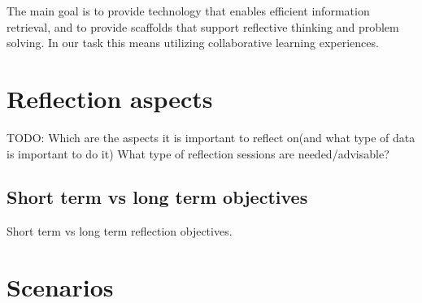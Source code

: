 The main goal is to provide technology that enables efficient information retrieval, and to provide scaffolds that support reflective thinking and problem solving. In our task this means utilizing collaborative learning experiences. 

\section{Reflection aspects}
TODO:
Which are the aspects it is important to reflect on(and what type of data is important to do it)
What type of reflection sessions are needed/advisable?
\subsection{Short term vs long term objectives}
Short term vs long term reflection objectives. 

\section{Scenarios}
\label{problemdefinition}

